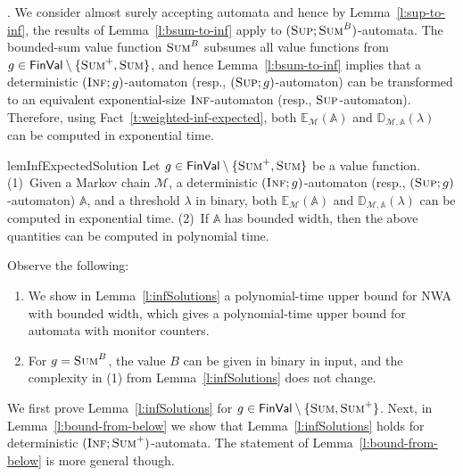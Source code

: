 \documentclass{lmcs}
\newcommand{\nestedA}{\mathbb{A}}
\newcommand{\fsum}{\textsc{Sum}}
\newcommand{\fBsum}[1]{\textsc{Sum}^{#1}}
\newcommand{\fsup}{\textsc{Sup}}
\newcommand{\finf}{\textsc{Inf}}
\newcommand{\const}{\lambda}
\newcommand{\FinVal}{\mathsf{FinVal}}
\newcommand{\expected}{\mathbb{E}}
\newcommand{\distrib}{\mathbb{D}}
\newcommand{\markov}{\mathcal{M}}
\begin{document}
\smallskip{}.
We consider almost surely accepting automata and hence by Lemma~\ref{l:sup-to-inf}, the results of Lemma~\ref{l:bsum-to-inf} apply to
$(\fsup; \fBsum{B})$-automata.
The bounded-sum value function $\fBsum{B}$ subsumes all value functions from $g\in  \FinVal \setminus \{ \fsum^+,\fsum \}$, and hence
Lemma~\ref{l:bsum-to-inf} implies that a deterministic $(\finf;g)$-automaton (resp., $(\fsup;g)$-automaton) can be transformed to an equivalent exponential-size
$\finf$-automaton (resp.,  $\fsup$-automaton).
Therefore, using Fact~\ref{t:weighted-inf-expected}, both $\expected_{\markov}(\nestedA)$ and $\distrib_{\markov,\nestedA}(\const)$
can be computed in exponential time.

\begin{restatable}{lem}{InfExpectedSolution}\label{l:infSolutions}
Let $g \in \FinVal \setminus \{ \fsum^+, \fsum \}$ be a value function.
(1)~Given a Markov chain $\markov$, a deterministic $(\finf;g)$-automaton (resp., $(\fsup; g)$-automaton) $\nestedA$, and a
threshold $\const$ in binary, both $\expected_{\markov}(\nestedA)$ and $\distrib_{\markov,\nestedA}(\const)$
can be computed in exponential time.
(2)~If $\nestedA$ has bounded width, then the above quantities can be computed in polynomial time.
\end{restatable}

\begin{rem}
Observe the following:
\begin{enumerate}
\item We show in Lemma~\ref{l:infSolutions} a polynomial-time upper bound for NWA with bounded width, which gives a
polynomial-time upper bound for automata with monitor counters.
\item For $g = \fBsum{B}$, the value $B$ can be given in binary in input, and the complexity  in (1) from Lemma~\ref{l:infSolutions}
does not change.
\end{enumerate}
\end{rem}

\noindent
We first prove Lemma~\ref{l:infSolutions} for $g \in \FinVal \setminus \{ \fsum,\fsum^+\}$.
Next, in Lemma~\ref{l:bound-from-below} we show that Lemma~\ref{l:infSolutions} holds for deterministic $(\finf;\fsum^+)$-automata.
The statement of Lemma~\ref{l:bound-from-below} is more general though.
\end{document}
